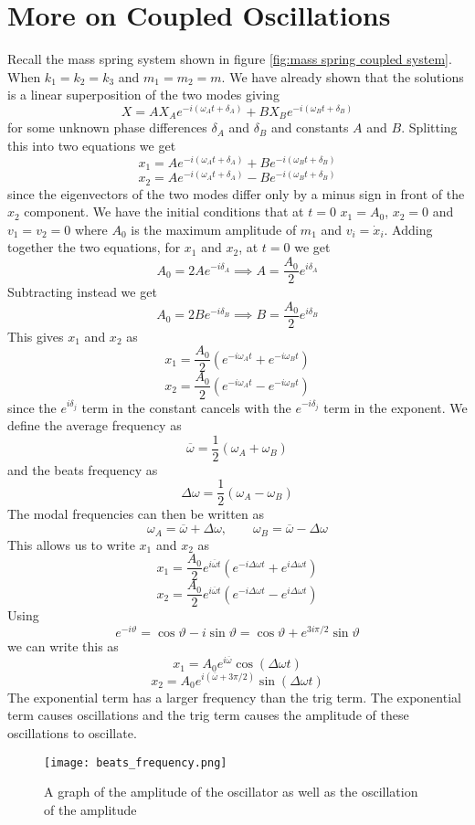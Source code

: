 \documentclass{article}
\begin{document}
    \section{More on Coupled Oscillations}
    Recall the mass spring system shown in figure \ref{fig:mass spring coupled system}. When \(k_1 = k_2 = k_3\) and \(m_1 = m_2 = m\).
    We have already shown that the solutions is a linear superposition of the two modes giving
    \[X = AX_Ae^{-i(\omega_A t + \delta_A)} + BX_Be^{-i(\omega_B t + \delta_B)}\]
    for some unknown phase differences \(\delta_A\) and \(\delta_B\) and constants \(A\) and \(B\).
    Splitting this into two equations we get
    \[x_1 = Ae^{-i(\omega_A t + \delta_A)} + Be^{-i(\omega_B t + \delta_B)}\]
    \[x_2 = Ae^{-i(\omega_A t + \delta_A)} - Be^{-i(\omega_B t + \delta_B)}\]
    since the eigenvectors of the two modes differ only by a minus sign in front of the \(x_2\) component.
    We have the initial conditions that at \(t = 0\) \(x_1 = A_0\), \(x_2 = 0\) and \(v_1 = v_2 = 0\) where \(A_0\) is the maximum amplitude of \(m_1\) and \(v_i = \dot x_i\).
    Adding together the two equations, for \(x_1\) and \(x_2\), at \(t = 0\) we get
    \[A_0 = 2Ae^{-i\delta_A} \implies A = \frac{A_0}{2}e^{i\delta_A}\]
    Subtracting instead we get
    \[A_0 = 2Be^{-i\delta_B} \implies B = \frac{A_0}{2}e^{i\delta_B}\]
    This gives \(x_1\) and \(x_2\) as
    \[x_1 = \frac{A_0}{2}(e^{-i\omega_A t} + e^{-i\omega_B t})\]
    \[x_2 = \frac{A_0}{2}(e^{-i\omega_A t} - e^{-i\omega_B t})\]
    since the \(e^{i\delta_j}\) term in the constant cancels with the \(e^{-i\delta_j}\) term in the exponent.
    We define the average frequency as
    \[\overline\omega = \frac{1}{2}(\omega_A + \omega_B)\]
    and the beats frequency as
    \[\Delta\omega = \frac{1}{2}(\omega_A - \omega_B)\]
    The modal frequencies can then be written as
    \[\omega_A = \overline\omega + \Delta\omega,\qquad \omega_B = \overline\omega - \Delta\omega\]
    This allows us to write \(x_1\) and \(x_2\) as
    \[x_1 = \frac{A_0}{2}e^{i\overline\omega t}(e^{-i\Delta\omega t} + e^{i\Delta\omega t})\]
    \[x_2 = \frac{A_0}{2}e^{i\overline\omega t}(e^{-i\Delta\omega t} - e^{i\Delta\omega t})\]
    Using
    \[e^{-i\vartheta} = \cos\vartheta - i\sin\vartheta = \cos\vartheta + e^{3i\pi/2}\sin\vartheta\]
    we can write this as
    \[x_1 = A_0e^{i\overline\omega}\cos(\Delta\omega t)\]
    \[x_2 = A_0e^{i(\overline\omega + 3\pi/2)}\sin(\Delta\omega t)\]
    The exponential term has a larger frequency than the trig term.
    The exponential term causes oscillations and the trig term causes the amplitude of these oscillations to oscillate.
    \begin{figure}[ht]
        \centering
        \texttt{[image: beats\_frequency.png]}
        \caption{A graph of the amplitude of the oscillator as well as the oscillation of the amplitude}
    \end{figure}
\end{document}
